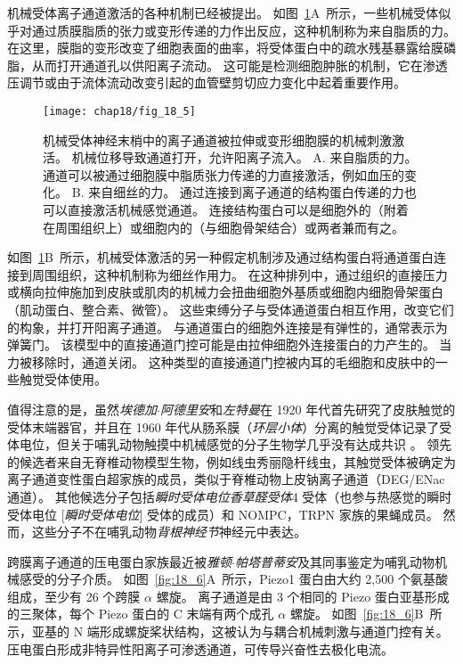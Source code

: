 机械受体离子通道激活的各种机制已经被提出。
如图~\ref{fig:18_5}A~所示，一些机械受体似乎对通过质膜脂质的张力或变形传递的力作出反应，这种机制称为来自脂质的力。
在这里，膜脂的变形改变了细胞表面的曲率，将受体蛋白中的疏水残基暴露给膜磷脂，从而打开通道孔以供阳离子流动。
这可能是检测细胞肿胀的机制，它在渗透压调节或由于流体流动改变引起的血管壁剪切应力变化中起着重要作用。


\begin{figure}[htbp]
	\centering
	\texttt{[image: chap18/fig\_18\_5]}
	\caption{机械受体神经末梢中的离子通道被拉伸或变形细胞膜的机械刺激激活。
		机械位移导致通道打开，允许阳离子流入\cite{lin2005trp}。
		A. 来自脂质的力。
		通道可以被通过细胞膜中脂质张力传递的力直接激活，例如血压的变化。
		B. 来自细丝的力。
		通过连接到离子通道的结构蛋白传递的力也可以直接激活机械感觉通道。
		连接结构蛋白可以是细胞外的（附着在周围组织上）或细胞内的（与细胞骨架结合）或两者兼而有之。}
	\label{fig:18_5}
\end{figure}


如图~\ref{fig:18_5}B~所示，机械受体激活的另一种假定机制涉及通过结构蛋白将通道蛋白连接到周围组织，这种机制称为细丝作用力。
在这种排列中，通过组织的直接压力或横向拉伸施加到皮肤或肌肉的机械力会扭曲细胞外基质或细胞内细胞骨架蛋白（肌动蛋白、整合素、微管）。
这些束缚分子与受体通道蛋白相互作用，改变它们的构象，并打开阳离子通道。
与通道蛋白的细胞外连接是有弹性的，通常表示为弹簧门。
该模型中的直接通道门控可能是由拉伸细胞外连接蛋白的力产生的。
当力被移除时，通道关闭。
这种类型的直接通道门控被内耳的毛细胞和皮肤中的一些触觉受体使用。


值得注意的是，虽然\textit{埃德加$\cdot$阿德里安}和\textit{左特曼}在 1920 年代首先研究了皮肤触觉的受体末端器官，并且在 1960 年代从肠系膜（\textit{环层小体}）分离的触觉受体记录了受体电位，但关于哺乳动物触摸中机械感觉的分子生物学几乎没有达成共识 。
领先的候选者来自无脊椎动物模型生物，例如线虫秀丽隐杆线虫，其触觉受体被确定为离子通道变性蛋白超家族的成员，类似于脊椎动物上皮钠离子通道（DEG/ENac 通道）。
其他候选分子包括\textit{瞬时受体电位香草醛受体}4 受体（也参与热感觉的瞬时受体电位 [\textit{瞬时受体电位}] 受体的成员）和 NOMPC，TRPN 家族的果蝇成员。
然而，这些分子不在哺乳动物\textit{背根神经节}神经元中表达。


跨膜离子通道的压电蛋白家族最近被\textit{雅顿$\cdot$帕塔普蒂安}及其同事鉴定为哺乳动物机械感受的分子介质。
如图~\ref{fig:18_6}A~所示，Piezo1 蛋白由大约 2,500 个氨基酸组成，至少有 26 个跨膜 $\alpha$ 螺旋。
离子通道是由 3 个相同的 Piezo 蛋白亚基形成的三聚体，每个 Piezo 蛋白的 C 末端有两个成孔 $\alpha$ 螺旋。
如图~\ref{fig:18_6}B~所示，亚基的 N 端形成螺旋桨状结构，这被认为与耦合机械刺激与通道门控有关。
压电蛋白形成非特异性阳离子可渗透通道，可传导兴奋性去极化电流。


